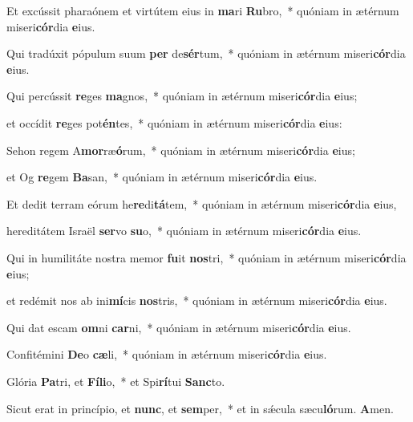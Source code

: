 \item Et excússit pharaónem et virtútem eius in \textbf{ma}ri \textbf{Ru}bro,~* quóniam in ætérnum miseri\textbf{cór}dia \textbf{e}ius.

\item Qui tradúxit pópulum suum \textbf{per} de\textbf{sér}tum,~* quóniam in ætérnum miseri\textbf{cór}dia \textbf{e}ius.

\item Qui percússit \textbf{re}ges \textbf{ma}gnos,~* quóniam in ætérnum miseri\textbf{cór}dia \textbf{e}ius;

\item et occídit \textbf{re}ges pot\textbf{én}tes,~* quóniam in ætérnum miseri\textbf{cór}dia \textbf{e}ius:

\item Sehon regem A\textbf{mor}ræ\textbf{ó}rum,~* quóniam in ætérnum miseri\textbf{cór}dia \textbf{e}ius;

\item et Og \textbf{re}gem \textbf{Ba}san,~* quóniam in ætérnum miseri\textbf{cór}dia \textbf{e}ius.

\item Et dedit terram eórum he\textbf{re}di\textbf{tá}tem,~* quóniam in ætérnum miseri\textbf{cór}dia \textbf{e}ius,

\item hereditátem Israël \textbf{ser}vo \textbf{su}o,~* quóniam in ætérnum miseri\textbf{cór}dia \textbf{e}ius.

\item Qui in humilitáte nostra memor \textbf{fu}it \textbf{nos}tri,~* quóniam in ætérnum miseri\textbf{cór}dia \textbf{e}ius;

\item et redémit nos ab ini\textbf{mí}cis \textbf{nos}tris,~* quóniam in ætérnum miseri\textbf{cór}dia \textbf{e}ius.

\item Qui dat escam \textbf{om}ni \textbf{car}ni,~* quóniam in ætérnum miseri\textbf{cór}dia \textbf{e}ius.

\item Confitémini \textbf{De}o \textbf{cæ}li,~* quóniam in ætérnum miseri\textbf{cór}dia \textbf{e}ius.

\item Glória \textbf{Pa}tri, et \textbf{Fí}\textbf{li}o,~* et Spi\textbf{rí}tui \textbf{Sanc}to.

\item Sicut erat in princípio, et \textbf{nunc}, et \textbf{sem}per,~* et in sǽcula sæcu\textbf{ló}rum. \textbf{A}men.